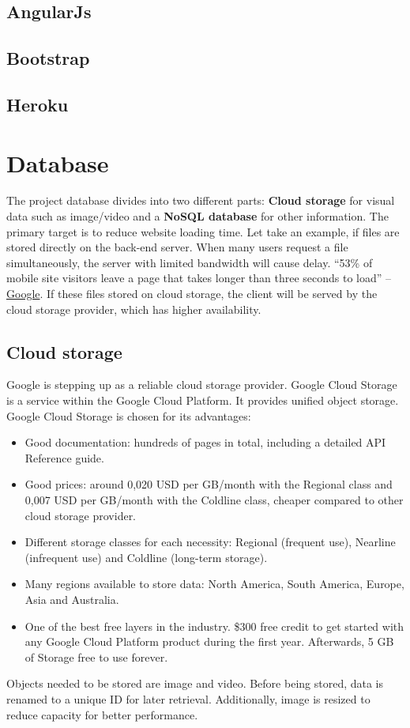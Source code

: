 \subsection{AngularJs}
\subsection{Bootstrap}
\subsection{Heroku}
\section{Database}
The project database divides into two different parts: \textbf{Cloud storage} for visual data such as image/video and a \textbf{NoSQL database} for other information. The primary target is to reduce website loading time. Let take an example, if files are stored directly on the back-end server. When many users request a file simultaneously, the server with limited bandwidth will cause delay. “53\% of mobile site visitors leave a page that takes longer than three seconds to load” – \href{https://think.storage.googleapis.com/docs/mobile-page-speed-new-industry-benchmarks.pdf}{Google}. If these files stored on cloud storage, the client will be served by the cloud storage provider, which has higher availability.
\subsection{Cloud storage}
Google is stepping up as a reliable cloud storage provider. Google Cloud Storage is a service within the Google Cloud Platform. It provides unified object storage. 
Google Cloud Storage is chosen for its advantages:
\begin{itemize}
\item Good documentation: hundreds of pages in total, including a detailed API Reference guide.
\item Good prices: around 0,020 USD per GB/month with the Regional class and 0,007 USD per GB/month with the Coldline class, cheaper compared to other cloud storage provider.
\item Different storage classes for each necessity: Regional (frequent use), Nearline (infrequent use) and Coldline (long-term storage).
\item Many regions available to store data: North America, South America, Europe, Asia and Australia.
\item One of the best free layers in the industry. \$300 free credit to get started with any Google Cloud Platform product during the first year. Afterwards, 5 GB of Storage free to use forever.
\end{itemize}
Objects needed to be stored are image and video. Before being stored, data is renamed to a unique ID for later retrieval. Additionally, image is resized to reduce capacity for better performance. 
